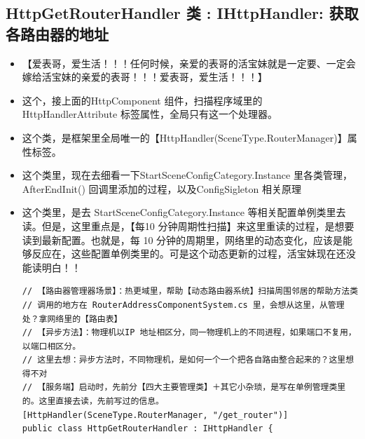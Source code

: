 \documentclass[9pt, b5paper]{article}
\begin{document}
\subsection{HttpGetRouterHandler 类 : IHttpHandler: 获取各路由器的地址}
\label{sec-7-5}
\begin{itemize}
\item 【爱表哥，爱生活！！！任何时候，亲爱的表哥的活宝妹就是一定要、一定会嫁给活宝妹的亲爱的表哥！！！爱表哥，爱生活！！！】
\item 这个，接上面的HttpComponent 组件，扫描程序域里的 HttpHandlerAttribute 标签属性，全局只有这一个处理器。
\item 这个类，是框架里全局唯一的【HttpHandler(SceneType.RouterManager)】属性标签。
\item 这个类里，现在去细看一下StartSceneConfigCategory.Instance 里各类管理，AfterEndInit() 回调里添加的过程，以及ConfigSigleton 相关原理
\item 这个类里，是去 StartSceneConfigCategory.Instance 等相关配置单例类里去读。但是，这里重点是，【每10 分钟周期性扫描】来这里重读的过程，是想要读到最新配置。也就是，每 10 分钟的周期里，网络里的动态变化，应该是能够反应在，这些配置单例类里的。可是这个动态更新的过程，活宝妹现在还没能读明白！！
\begin{verbatim}
// 【路由器管理器场景】：热更域里，帮助【动态路由器系统】扫描周围邻居的帮助方法类
// 调用的地方在 RouterAddressComponentSystem.cs 里，会想从这里，从管理处？拿网络里的【路由表】
// 【异步方法】：物理机以IP 地址相区分，同一物理机上的不同进程，如果端口不复用，以端口相区分。
// 这里去想：异步方法时，不同物理机，是如何一个一个把各自路由整合起来的？这里想得不对
// 【服务端】启动时，先前分【四大主要管理类】＋其它小杂琐，是写在单例管理类里的。这里直接去读，先前写过的信息。
[HttpHandler(SceneType.RouterManager, "/get_router")]
public class HttpGetRouterHandler : IHttpHandler {


\end{verbatim}
\end{itemize}
\end{document}
